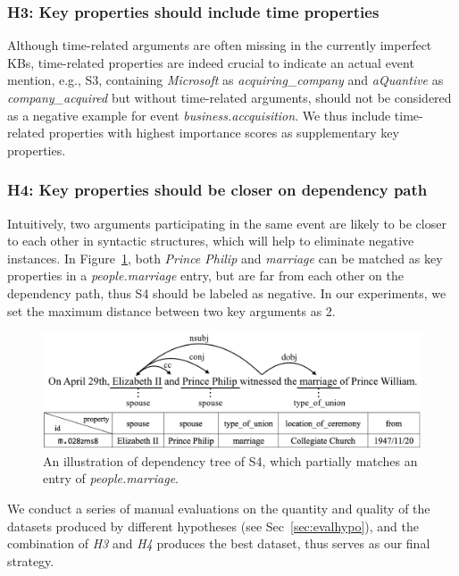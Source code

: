 \subsubsection{H3: Key properties should include time properties}
Although time-related arguments are often missing in the currently imperfect KBs, time-related properties are indeed
crucial to indicate an actual event mention, e.g., S3, containing  \emph{Microsoft} as \emph{acquiring\_company} and \emph{aQuantive} as \emph{company\_acquired} but without time-related arguments, should not be considered as a negative example for
event \emph{business.accquisition}.
We thus include time-related properties with highest importance scores  as supplementary key properties. 

\subsubsection{H4: Key properties should be closer on dependency path}
Intuitively, two arguments participating in the same event are likely to be closer to each other in syntactic structures, which will help to eliminate negative instances. In Figure~\ref{fig:2},  both  \emph{Prince Philip} and \emph{marriage} can be matched as key properties in a \textit{people.marriage} entry,  but are far from each other on the dependency path, thus S4 should be labeled as negative.
In our experiments, we set the maximum distance between two key arguments as 2.

\begin{figure}
	\includegraphics[width=.48\textwidth]{deppath2}
	\caption{An illustration of dependency tree of S4, which partially matches an entry of \emph{people.marriage}. \label{fig:2}}
\end{figure}

We conduct a series of manual evaluations on the quantity and quality of the 
 datasets produced by different hypotheses (see Sec~\ref{sec:evalhypo}), 
and the combination of  \emph{H3} and \emph{H4} produces the best dataset, thus serves 
as our final strategy.
